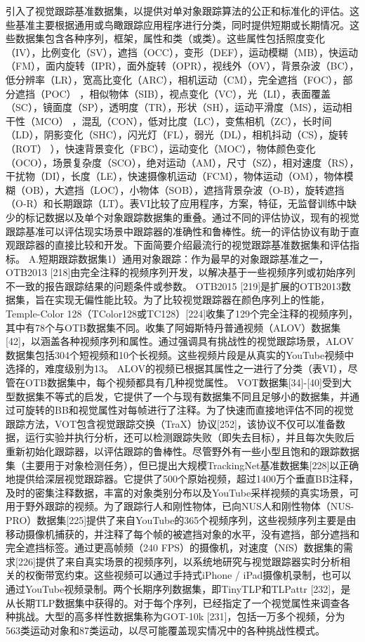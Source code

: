 引入了视觉跟踪基准数据集，以提供对单对象跟踪算法的公正和标准化的评估。这些基准主要根据通用或鸟瞰跟踪应用程序进行分类，同时提供短期或长期情况。这些数据集包含各种序列，框架，属性和类（或类）。这些属性包括照度变化（IV），比例变化（SV），遮挡（OCC），变形（DEF），运动模糊（MB），快运动（FM），面内旋转（IPR），面外旋转（OPR），视线外（OV），背景杂波（BC），低分辨率（LR），宽高比变化（ARC），相机运动（CM），完全遮挡（FOC），部分遮挡（POC） ，相似物体（SIB），视点变化（VC），光（LI），表面覆盖（SC），镜面度（SP），透明度（TR），形状（SH），运动平滑度（MS），运动相干性（MCO） ，混乱（CON），低对比度（LC），变焦相机（ZC），长时间（LD），阴影变化（SHC），闪光灯（FL），弱光（DL），相机抖动（CS），旋转（ROT） ），快速背景变化（FBC），运动变化（MOC），物体颜色变化（OCO），场景复杂度（SCO），绝对运动（AM），尺寸（SZ），相对速度（RS），干扰物（DI），长度（LE），快速摄像机运动（FCM），物体运动（OM），物体模糊（OB），大遮挡（LOC），小物体（SOB），遮挡背景杂波（O-B），旋转遮挡（O-R）和长期跟踪（LT）。表VI比较了应用程序，方案，特征，无监督训练中缺少的标记数据以及单个对象跟踪数据集的重叠。通过不同的评估协议，现有的视觉跟踪基准可以评估现实场景中跟踪器的准确性和鲁棒性。统一的评估协议有助于直观跟踪器的直接比较和开发。下面简要介绍最流行的视觉跟踪基准数据集和评估指标。 A.短期跟踪数据集1）通用对象跟踪：作为最早的对象跟踪基准之一，OTB2013 [218]由完全注释的视频序列开发，以解决基于一些视频序列或初始序列不一致的报告跟踪结果的问题条件或参数。 OTB2015 [219]是扩展的OTB2013数据集，旨在实现无偏性能比较。为了比较视觉跟踪器在颜色序列上的性能，Temple-Color 128（TColor128或TC128）[224]收集了129个完全注释的视频序列，其中有78个与OTB数据集不同。收集了阿姆斯特丹普通视频（ALOV）数据集[42]，以涵盖各种视频序列和属性。通过强调具有挑战性的视觉跟踪场景，ALOV数据集包括304个短视频和10个长视频。这些视频片段是从真实的YouTube视频中选择的，难度级别为13。 ALOV的视频已根据其属性之一进行了分类（表VI），尽管在OTB数据集中，每个视频都具有几种视觉属性。 VOT数据集[34]-[40]受到大型数据集不等式的启发，它提供了一个与现有数据集不同且足够小的数据集，并通过可旋转的BB和视觉属性对每帧进行了注释。为了快速而直接地评估不同的视觉跟踪方法，VOT包含视觉跟踪交换（TraX）协议[252]，该协议不仅可以准备数据，运行实验并执行分析，还可以检测跟踪失败（即失去目标），并且每次失败后重新初始化跟踪器，以评估跟踪的鲁棒性。尽管野外有一些小型且饱和的跟踪数据集（主要用于对象检测任务），但已提出大规模TrackingNet基准数据集[228]以正确地提供给深层视觉跟踪器。它提供了500个原始视频，超过1400万个垂直BB注释，及时的密集注释数据，丰富的对象类别分布以及YouTube采样视频的真实场景，可用于野外跟踪的视频。为了跟踪行人和刚性物体，已向NUS人和刚性物体（NUS-PRO）数据集[225]提供了来自YouTube的365个视频序列，这些视频序列主要是由移动摄像机捕获的，并注释了每个帧的被遮挡对象的水平，没有遮挡，部分遮挡和完全遮挡标签。通过更高帧频（240 FPS）的摄像机，对速度（NfS）数据集的需求[226]提供了来自真实场景的视频序列，以系统地研究与视觉跟踪器实时分析相关的权衡带宽约束。这些视频可以通过手持式iPhone / iPad摄像机录制，也可以通过YouTube视频录制。两个长期序列数据集，即TinyTLP和TLPattr [232]，是从长期TLP数据集中获得的。对于每个序列，已经指定了一个视觉属性来调查各种挑战。大型的高多样性数据集称为GOT-10k [231]，包括一万多个视频，分为563类运动对象和87类运动，以尽可能覆盖现实情况中的各种挑战性模式。 